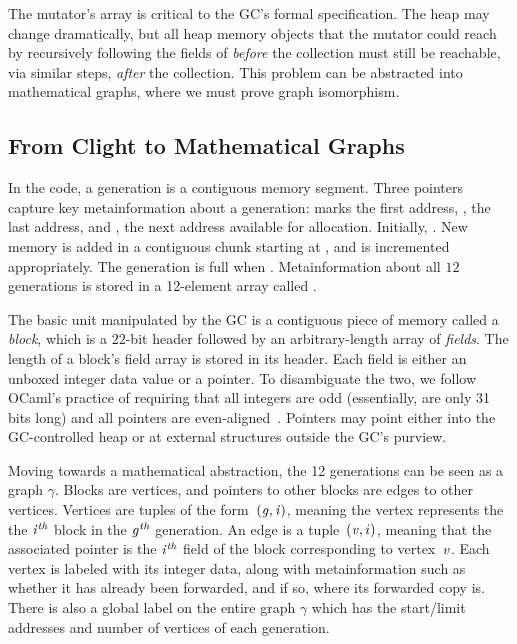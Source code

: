 The mutator's  array is critical to the GC's formal specification.
The heap may change dramatically, but all heap memory objects 
that the mutator could reach by recursively
following the fields of  \emph{before} the collection 
must still be reachable, via similar steps, \emph{after} the collection.  This problem can be abstracted 
into mathematical graphs, where we must prove graph isomorphism.

\subsection{From Clight to Mathematical Graphs}
\label{sec:movetomathgraph}
In the code, a generation is a contiguous memory segment. 
Three pointers capture key metainformation about a generation:
 marks the first address, ,
the last address, and , the next address available for 
allocation.  
Initially, . 
New memory is added in a contiguous chunk starting 
at , and  is
incremented appropriately. 
The generation is full when .
Metainformation about all $12$ generations is stored in 
a 12-element array called .
	
The basic unit manipulated by the GC is a
contiguous piece of memory called a \emph{block}, which is a 
$22$-bit header followed by an arbitrary-length array of \emph{fields}.
The length of a block's field array is stored in its header.
Each field is either an unboxed integer data value or a pointer. 
To disambiguate the two,
we follow OCaml's practice of requiring that all integers are odd 
(essentially, are only 31 bits long) and all pointers are even-aligned~\cite{realworldocaml}. Pointers may point either into the GC-controlled heap or at external structures outside the GC's purview.

Moving towards a mathematical abstraction, the 12 generations can be seen
as a graph $\gamma$. Blocks are
vertices, and pointers to other blocks are edges to other
vertices. 
Vertices are tuples of the form~$(\mathit{g}, \mathit{i})$, meaning the vertex represents the 
the $\mathit{i}^{\textit{th}}$ block in the $\mathit{g}^{\textit{th}}$ generation. 
An edge is a tuple~$(\mathit{v}, i)$, meaning that 
the associated pointer is the $\mathit{i}^{\textit{th}}$ field of the block
corresponding to vertex~$\mathit{v}$. 
Each vertex is labeled with its integer data, along with 
metainformation such as whether it has already been forwarded, 
and if so, where its forwarded copy is.
There is also a global label on the entire graph $\gamma$ which has the
start/limit addresses and number of vertices of each generation. 

